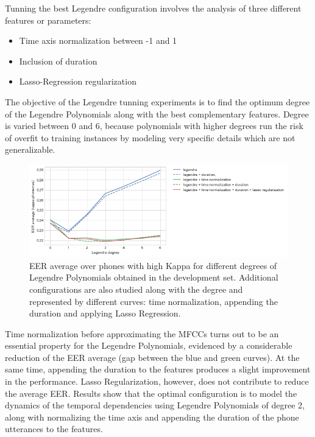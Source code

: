 Tunning the best Legendre configuration involves the analysis of three different
features or parameters:

\begin{itemize}
	\item Time axis normalization between -1 and 1
	\item Inclusion of duration
	\item Lasso-Regression regularization
\end{itemize}

The objective of the Legendre tunning experiments is to find the optimum degree of the Legendre
Polynomials along with the best complementary features. Degree is varied between 0 and 6,
because polynomials with
higher degrees run the risk of overfit to training instances by modeling very specific
details which are not generalizable.


\begin{figure}[H]
	\centering
	\includegraphics[width=1.0\textwidth]{files/figures/results/legendre-dct/legendre-tunning.png}
	\caption{EER average over phones with high Kappa for different
	degrees of Legendre Polynomials obtained in
	the development set. Additional configurations are also studied along with the degree and
	represented by different curves: time normalization, appending the duration and applying
	Lasso Regression.}
	\label{fig:legendreTunning}
\end{figure}

Time normalization before approximating the
MFCCs turns out to be an essential property for the Legendre Polynomials, evidenced by a
considerable reduction of the EER average (gap between the blue and green curves). At the same
time, appending the duration to the features produces a slight improvement in the performance.
Lasso Regularization, however, does not contribute to reduce the average EER.
Results show that the optimal configuration is to model the dynamics of the temporal dependencies
using Legendre Polynomials of degree 2,
along with normalizing the time axis and appending the duration of the
phone utterances to the features.


